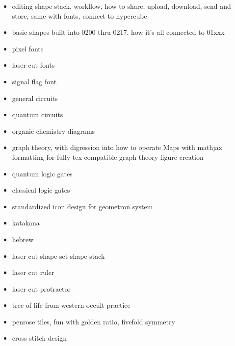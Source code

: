 \begin{itemize}
\tightlist
\item
editing shape stack, workflow, how to share, upload, download, send and store, same with fonts, connect to hypercube
\item
basic shapes built into 0200 thru 0217, how it's all connected to 01xxx
\item
pixel fonts
\item
laser cut fonts
\item
signal flag font
\item
general circuits
\item
quantum circuits
\item
organic chemistry diagrams
\item
graph theory, with digression into how to operate Maps with mathjax formatting for fully tex compatible graph theory figure creation
\item
quantum logic gates
\item 
classical logic gates
\item
standardized icon design for geometron system
\item
katakana
\item
hebrew
\item
laser cut shape set shape stack
\item
laser cut ruler
\item
laser cut protractor
\item
tree of life from western occult practice
\item
penrose tiles, fun with golden ratio, fivefold symmetry
\item
cross stitch design
\end{itemize}